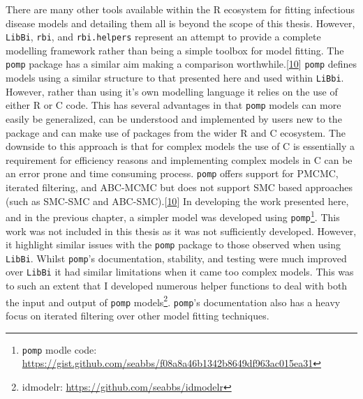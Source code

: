 \documentclass[11pt,twoside]{bristolthesis}
\begin{document}
  There are many other tools available within the R ecosystem for fitting infectious disease models and detailing them all is beyond the scope of this thesis. However, \texttt{LibBi}, \texttt{rbi}, and \texttt{rbi.helpers} represent an attempt to provide a complete modelling framework rather than being a simple toolbox for model fitting. The \texttt{pomp} package has a similar aim making a comparison worthwhile.{[}\protect\hyperlink{ref-King2016}{10}{]} \texttt{pomp} defines models using a similar structure to that presented here and used within \texttt{LiBbi}. However, rather than using it's own modelling language it relies on the use of either R or C code. This has several advantages in that \texttt{pomp} models can more easily be generalized, can be understood and implemented by users new to the package and can make use of packages from the wider R and C ecosystem. The downside to this approach is that for complex models the use of C is essentially a requirement for efficiency reasons and implementing complex models in C can be an error prone and time consuming process. \texttt{pomp} offers support for PMCMC, iterated filtering, and ABC-MCMC but does not support SMC based approaches (such as SMC-SMC and ABC-SMC).{[}\protect\hyperlink{ref-King2016}{10}{]} In developing the work presented here, and in the previous chapter, a simpler model was developed using \texttt{pomp}\footnote{\texttt{pomp} modle code: \url{https://gist.github.com/seabbs/f08a8a46b1342b8649df963ac015ea31}}. This work was not included in this thesis as it was not sufficiently developed. However, it highlight similar issues with the \texttt{pomp} package to those observed when using \texttt{LibBi}. Whilst \texttt{pomp}'s documentation, stability, and testing were much improved over \texttt{LibBi} it had similar limitations when it came too complex models. This was to such an extent that I developed numerous helper functions to deal with both the input and output of \texttt{pomp} models\footnote{idmodelr: \url{https://github.com/seabbs/idmodelr}}. \texttt{pomp}'s documentation also has a heavy focus on iterated filtering over other model fitting techniques.
  
\end{document}
